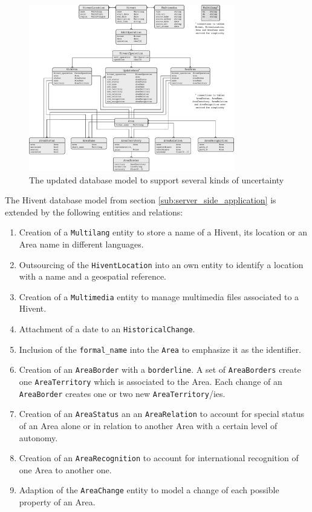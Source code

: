 \begin{figure}[ht]
  \vspace{1em}
  \centering
  \includegraphics[width = 0.8\textwidth]{graphics/extensions/new_database_model}
  \caption{The updated database model to support several kinds of uncertainty}
  \label{fig:new_data_model}
\end{figure}

The Hivent database model from section \ref{sub:server_side_application} is extended by the following entities and relations:

\vspace{-1em}
\begin{enumerate}
  \item Creation of a \texttt{Multilang} entity to store a name of a Hivent, its location or an Area name in different languages.
  \item Outsourcing of the \texttt{HiventLocation} into an own entity to identify a location with a name and a geospatial reference.
  \item Creation of a \texttt{Multimedia} entity to manage multimedia files associated to a Hivent.
  \item Attachment of a date to an \texttt{HistoricalChange}.
  \item Inclusion of the \texttt{formal\_name} into the \texttt{Area} to emphasize it as the identifier.
  \item Creation of an \texttt{AreaBorder} with a \texttt{borderline}. A set of \texttt{AreaBorders} create one \texttt{AreaTerritory} which is associated to the Area. Each change of an \texttt{AreaBorder} creates one or two new \texttt{AreaTerritory}/ies.
  \item Creation of an \texttt{AreaStatus} an an \texttt{AreaRelation} to account for special status of an Area alone or in relation to another Area with a certain level of autonomy.
  \item Creation of an \texttt{AreaRecognition} to account for international recognition of one Area to another one.
  \item Adaption of the \texttt{AreaChange} entity to model a change of each possible property of an Area.
\end{enumerate}

